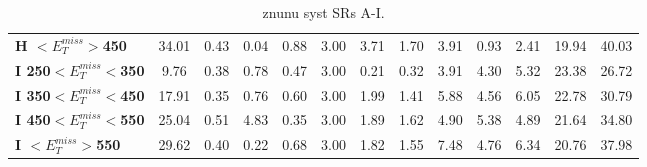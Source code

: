\begin{table}[h]
\begin{center}
{\begin{tabular}{|l|cccccccccccc|}
\textbf{ H $<E_T^{miss}>$450}    & 34.01         & 0.43          & 0.04          & 0.88          & 3.00          & 3.71          & 1.70          & 3.91          & 0.93          & 2.41          & 19.94         & 40.03         \\
\textbf{ I 250$<E_T^{miss}<$350}         & 9.76          & 0.38          & 0.78          & 0.47          & 3.00          & 0.21          & 0.32          & 3.91          & 4.30          & 5.32          & 23.38         & 26.72         \\
\textbf{ I 350$<E_T^{miss}<$450}         & 17.91         & 0.35          & 0.76          & 0.60          & 3.00          & 1.99          & 1.41          & 5.88          & 4.56          & 6.05          & 22.78         & 30.79         \\
\textbf{ I 450$<E_T^{miss}<$550}         & 25.04         & 0.51          & 4.83          & 0.35          & 3.00          & 1.89          & 1.62          & 4.90          & 5.38          & 4.89          & 21.64         & 34.80         \\
\textbf{ I $<E_T^{miss}>$550}    & 29.62         & 0.40          & 0.22          & 0.68          & 3.00          & 1.82          & 1.55          & 7.48          & 4.76          & 6.34          & 20.76         & 37.98         \\
\hline
\end{tabular}}
\caption[Table caption text]{znunu syst SRs A-I. }
\label{tab:SysZnunu}
\end{center}
\end{table}


